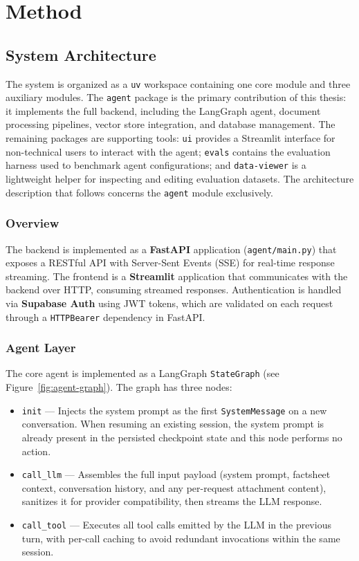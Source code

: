 \chapter{Method}
\label{chap:method}


\section{System Architecture}

The system is organized as a \texttt{uv} workspace containing one core module and three auxiliary modules. The \texttt{agent} package is the primary contribution of this thesis: it implements the full backend, including the LangGraph agent, document processing pipelines, vector store integration, and database management. The remaining packages are supporting tools: \texttt{ui} provides a Streamlit interface for non-technical users to interact with the agent; \texttt{evals} contains the evaluation harness used to benchmark agent configurations; and \texttt{data-viewer} is a lightweight helper for inspecting and editing evaluation datasets. The architecture description that follows concerns the \texttt{agent} module exclusively.

\subsection{Overview}

The backend is implemented as a \textbf{FastAPI} \cite{fastapi} application (\texttt{agent/main.py}) that exposes a RESTful API with Server-Sent Events (SSE) for real-time response streaming. The frontend is a \textbf{Streamlit} application that communicates with the backend over HTTP, consuming streamed responses. Authentication is handled via \textbf{Supabase Auth} using JWT tokens, which are validated on each request through a \texttt{HTTPBearer} dependency in FastAPI.

\subsection{Agent Layer}

The core agent is implemented as a LangGraph \texttt{StateGraph} (see Figure~\ref{fig:agent-graph}). The graph has three nodes:

\begin{itemize}
    \item \texttt{init} — Injects the system prompt as the first \texttt{SystemMessage} on a new conversation. When resuming an existing session, the system prompt is already present in the persisted checkpoint state and this node performs no action.
    \item \texttt{call\_llm} — Assembles the full input payload (system prompt, factsheet context, conversation history, and any per-request attachment content), sanitizes it for provider compatibility, then streams the LLM response.
    \item \texttt{call\_tool} — Executes all tool calls emitted by the LLM in the previous turn, with per-call caching to avoid redundant invocations within the same session.
\end{itemize}

